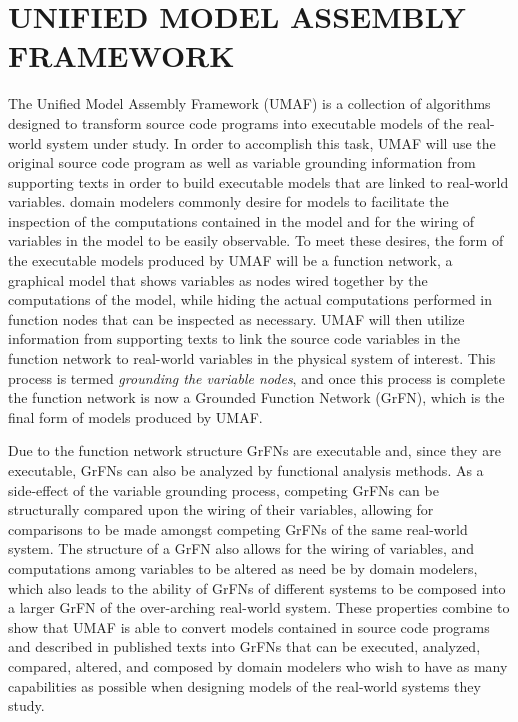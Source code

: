 \chapter{UNIFIED MODEL ASSEMBLY FRAMEWORK\label{chapter:umaf}}
The Unified Model Assembly Framework (UMAF) is a collection of algorithms designed to transform source code programs into executable models of the real-world system under study.
In order to accomplish this task, UMAF will use the original source code program as well as variable grounding information from supporting texts in order to build executable models that are linked to real-world variables.
domain modelers commonly desire for models to facilitate the inspection of the computations contained in the model and for the wiring of variables in the model to be easily observable.
To meet these desires, the form of the executable models produced by UMAF will be a function network, a graphical model that shows variables as nodes wired together by the computations of the model, while hiding the actual computations performed in function nodes that can be inspected as necessary.
UMAF will then utilize information from supporting texts to link the source code variables in the function network to real-world variables in the physical system of interest.
This process is termed \textit{grounding the variable nodes}, and once this process is complete the function network is now a Grounded Function Network (GrFN), which is the final form of models produced by UMAF.

Due to the function network structure GrFNs are executable and, since they are executable, GrFNs can also be analyzed by functional analysis methods.
As a side-effect of the variable grounding process, competing GrFNs can be structurally compared upon the wiring of their variables, allowing for comparisons to be made amongst competing GrFNs of the same real-world system.
The structure of a GrFN also allows for the wiring of variables, and computations among variables to be altered as need be by domain modelers, which also leads to the ability of GrFNs of different systems to be composed into a larger GrFN of the over-arching real-world system.
These properties combine to show that UMAF is able to convert models contained in source code programs and described in published texts into GrFNs that can be executed, analyzed, compared, altered, and composed by domain modelers who wish to have as many capabilities as possible when designing models of the real-world systems they study.


